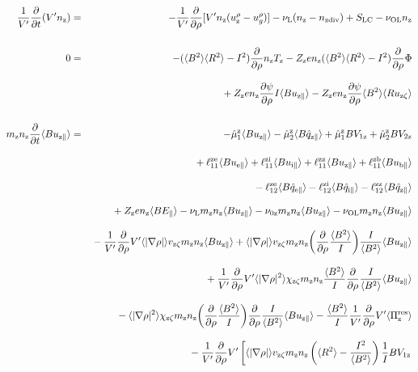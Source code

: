 \documentclass[11pt]{article}
\def\r#1{{\rm#1}}
\def\aves#1{\langle#1\rangle}
\def\dd#1#2{\frac{\partial #1}{\partial #2}}
\def\para{\parallel}
\def\ddrho{\frac{\partial}{\partial\rho}}
\def\ddt{\frac{\partial}{\partial t}}
\def\mz{m_\r{z}}
\def\nz{n_\r{z}}
\def\Tz{T_\r{z}}
\def\Zz{Z_\r{z}}
\def\uzt#1{u_{\r{#1}\zeta}}
\def\upara#1{u_{\r{#1}\para}}
\def\qhatpara#1{\hat{q}_{\r{#1}\para}}
\def\urho#1{u_\r{#1}^\rho}
\def\ugrho{u_{g}^\rho}
\def\chis#1{\chi_\r{#1}}
\def\nun#1{\nu_\r{0#1}}
\def\ndiv#1{n_\r{#1div}}
\def\bri{\aves{B^2}\aves{R^2} - I^2}
\def\nuL{\nu_\r{L}}
\def\nuOL{\nu_\r{OL}}
\begin{document}
%
\begin{eqnarray}
  \frac{1}{V'} \ddt ( V' \nz ) &=&
%
  - \frac{1}{V'} \ddrho [ V' \nz (\urho{z} - \ugrho) ]
%
  - \nuL (\nz - \ndiv{z}) 
%
  + S_\r{LC}
%
  - \nuOL \nz
%
\\[5mm]
  0 &=&
%
  -           ( \bri ) \ddrho \nz \Tz
%
  - \Zz e \nz ( \bri ) \ddrho \Phi
\nonumber\\[3mm]&&{}
%
  + \Zz e \nz \dd{\psi}{\rho} I          \aves{B\upara{z}}
%
  - \Zz e \nz \dd{\psi}{\rho} \aves{B^2} \aves{R\uzt{z}}
\\[5mm]
  \mz \nz \ddt \aves{B \upara{z}} &=&
%
  - \hat{\mu}_1^\r{z} \aves{B \upara{z}} 
  - \hat{\mu}_2^\r{z} \aves{B \qhatpara{z}}
%
  + \hat{\mu}_1^\r{z} {B V_{1\r{z}}} 
  + \hat{\mu}_2^\r{z} {B V_{2\r{z}}}
\nonumber\\[3mm]&&{}
%
  + \ell_{11}^{\r{ze}} \aves{B \upara{e}}
  + \ell_{11}^{\r{zi}} \aves{B \upara{i}}
  + \ell_{11}^{\r{zz}} \aves{B \upara{z}}
  + \ell_{11}^{\r{zb}} \aves{B \upara{b}}
\nonumber\\[3mm]&&{}
%
  - \ell_{12}^{\r{ze}} \aves{B \qhatpara{e}}
  - \ell_{12}^{\r{zi}} \aves{B \qhatpara{i}}
  - \ell_{12}^{\r{zz}} \aves{B \qhatpara{z}}
\nonumber\\[3mm]&&{}
%
  + \Zz e \nz \aves{B E_\para}
%
%
%
  - \nuL  \mz \nz \aves{B \upara{z}}
%
  - \nun{z} \mz \nz \aves{B \upara{z}}
%
  - \nuOL \mz \nz \aves{B \upara{z}}
\nonumber\\[3mm]&&{}
%
  - \frac{1}{V'} \ddrho V' \aves{|\nabla \rho|} v_{\r{z}\zeta} \mz \nz \aves{B \upara{z}}
%
  + \aves{|\nabla \rho|} v_{\r{z}\zeta} \mz \nz 
  \biggl(\ddrho \frac{\aves{B^2}}{I} \biggl) \frac{I}{\aves{B^2}} \aves{B \upara{z}}
\nonumber\\[3mm]&&{}
%
  + \frac{1}{V'} \ddrho V' \aves{|\nabla \rho|^2} \chis{z\zeta} \mz \nz
  \frac{\aves{B^2}}{I} \ddrho \frac{I}{\aves{B^2}} \aves{B \upara{z}}
\nonumber\\[3mm]&&{}
%
  - \aves{|\nabla \rho|^2} \chis{z\zeta} \mz \nz \biggl( \ddrho
  \frac{\aves{B^2}}{I} \biggr) \ddrho \frac{I}{\aves{B^2}} \aves{B \upara{z}}
%
  - \frac{\aves{B^2}}{I} \frac{1}{V'} \ddrho V' \aves{\Pi_\r{z}^\r{res}}
\nonumber\\[3mm]&&{}
%
  - \frac{1}{V'} \ddrho V' 
    \left[  \aves{|\nabla\rho|} v_{\r{z}\zeta} \mz \nz
          \left(\aves{R^2} - \frac{I^2}{\aves{B^2}}\right) \frac{1}{I}BV_{1\r{z}} \right.

\end{eqnarray}
\end{document}
